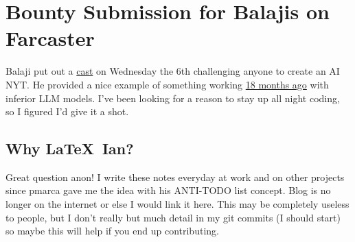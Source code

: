 \newpage
\section{Bounty Submission for Balajis on Farcaster}

Balaji put out a
\textcolor{purple}{\href{https://warpcast.com/balajis.eth/0x218b92a7}{cast}} on
Wednesday the 6th challenging anyone to create an AI NYT. He provided a nice
example of something working
\textcolor{blue}{\href{https://twitter.com/balajis/status/1601398685106991105?s=46}{18
months ago}} with inferior LLM models. I've been looking for a reason to stay up
all night coding, so I figured I'd give it a shot.


\subsection*{Why \LaTeX\ Ian?}
Great question anon! I write these notes everyday at work and on other projects
since pmarca gave me the idea with his ANTI-TODO list concept. Blog is no longer
on the internet or else I would link it here. This may be completely useless to
people, but I don't really but much detail in my git commits (I should start) so
maybe this will help if you end up contributing.
